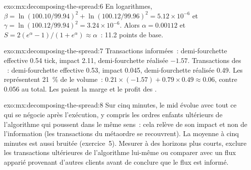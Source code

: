 \begin{solution}{exo:mx:decomposing-the-spread:6}
En logarithmes, $\beta=\ln(100.10/99.94)^2+\ln(100.12/99.96)^2=5.12\times10^{-6}$ et $\gamma=\ln(100.12/99.94)^2=3.24\times10^{-6}$. Alors $\alpha=0.00112$ et
$S=2(e^\alpha-1)/(1+e^\alpha)\approx\alpha$~: 11.2 points de base.
\end{solution}

\begin{solution}{exo:mx:decomposing-the-spread:7}
Transactions informées~: demi-fourchette effective 0.54 tick, impact 2.11, demi-fourchette réalisée $-1.57$. Transactions des ~: demi-fourchette effective 0.53, impact 0.045, demi-fourchette réalisée 0.49. Les  représentent 21~\% de
le volume~: $0.21\times(-1.57)+0.79\times0.49\approx0.06$, contre 0.056 au total. Les  paient la marge et le profit des .
\end{solution}

\begin{solution}{exo:mx:decomposing-the-spread:8}
Sur cinq minutes, le mid évolue avec tout ce qui se négocie après l'exécution, y compris les ordres enfants ultérieurs de l'algorithme qui poussent dans le même sens~: cela
relève de son impact et non de l'information (les transactions du métaordre se recouvrent). La moyenne à cinq minutes est aussi bruitée (exercice~5). Mesurer à des horizons plus courts,
exclure les transactions ultérieures de l'algorithme lui-même ou comparer avec un flux apparié provenant d'autres clients avant de conclure que le flux est informé.
\end{solution}

